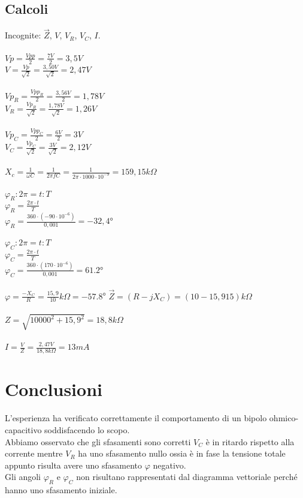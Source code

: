 \documentclass[12pt]{article}
\begin{document}
    \subsection{Calcoli}
    Incognite: $\vec{Z}$, $V$, $V_R$, $V_C$, $I$.\\
    \\
    $Vp=\frac{Vpp}{2}=\frac{7V}{2}=3,5V$\\
    $V=\frac{Vp}{\sqrt{2}}=\frac{3,50V}{\sqrt{2}}=2,47V$\\
    \\
    $Vp_R=\frac{Vpp_R}{2}=\frac{3,56V}{2}=1,78V$\\
    $V_R=\frac{Vp_R}{\sqrt{2}}=\frac{1,78V}{\sqrt{2}}=1,26V$\\
    \\
    $Vp_C=\frac{Vpp_C}{2}=\frac{6V}{2}=3V$\\
    $V_C=\frac{Vp_C}{\sqrt{2}}=\frac{3V}{\sqrt{2}}=2,12V$\\
    \\
    $X_c=\frac{1}{\omega C}=\frac{1}{2\pi f C}=\frac{1}{2\pi\cdot 1000 \cdot 10^{-9}}=159,15k\Omega$\\
    \\
    $\varphi_R:2\pi=t:T$ \\
    $\varphi_R=\frac{2\pi \cdot t}{T}$\\
    $\varphi_R=\frac{360 \cdot (-90\cdot 10^{-6})}{0,001}=-32,4$°\\
    \\
    $\varphi_C:2\pi=t:T$ \\
    $\varphi_C=\frac{2\pi \cdot t}{T}$\\
    $\varphi_C=\frac{360 \cdot (170\cdot 10^{-6})}{0,001}=61.2$°\\
    \\
    $\varphi=\frac{-X_C}{R}=\frac{15,9}{10}k\Omega=-57.8$°
    $\vec{Z}=(R-jX_C)=(10-15,915)k\Omega$\\
    \\
    $Z=\sqrt{10000^2+15,9^2}=18,8k\Omega$\\
    \\
    $I=\frac{V}{Z}=\frac{2,47V}{18,8k\Omega}=13 mA$\\
\section{Conclusioni}
L'esperienza ha verificato correttamente il comportamento di un bipolo ohmico-capacitivo soddisfacendo lo scopo.\\
Abbiamo osservato che gli sfasamenti sono corretti $V_C$ è in ritardo rispetto alla corrente mentre $V_R$ ha uno sfasamento nullo ossia è in fase
la tensione totale appunto risulta avere uno sfasamento $\varphi$ negativo.\\
Gli angoli $\varphi_R$ e $\varphi_C$ non risultano rappresentati dal diagramma vettoriale perché hanno uno sfasamento iniziale. 
\end{document}
